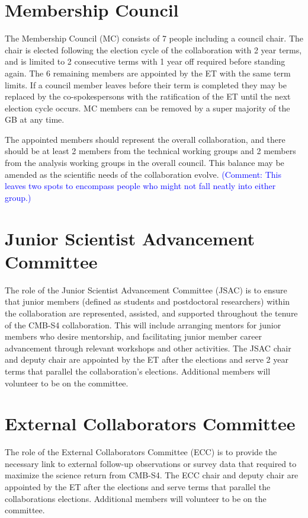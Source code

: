 \documentclass[12pt]{article}
\newcommand{\Comment}[1]{\textcolor{Blue}{(Comment: #1)}}
\newcommand{\exec}{{Executive Team}}
\newcommand{\shorte}{{ET }}  %
\begin{document}
\section{Membership Council}

The Membership Council (MC) consists of 7 people including a council chair. The chair is elected following the election cycle of the collaboration with  2 year terms, and is limited to 2 consecutive terms with 1 year off required before standing again. The 6 remaining members are appointed by the \shorte with the same term limits. If a council member leaves before their term is completed they may be replaced by the co-spokespersons with the ratification of the \shorte until the next election cycle occurs. MC members can be removed by a super majority of the GB at any time.  


The appointed members should represent the overall collaboration, and there should be at least 2 members from the technical working groups and 2 members from the analysis working groups in the overall council. This balance may be amended as the scientific needs of the collaboration evolve. \Comment{This leaves two spots to encompass people who might not fall neatly into either group.}





\section{Junior Scientist Advancement Committee}

The role of the Junior Scientist Advancement Committee (JSAC) is to ensure that junior members (defined as students and postdoctoral researchers) within the collaboration are represented, assisted, and supported throughout the  tenure of the CMB-S4 collaboration. This will include arranging mentors for junior members who desire mentorship, and facilitating junior member career advancement through relevant workshops and other activities. The JSAC chair and deputy chair are appointed by the \shorte after the elections and serve 2 year terms that parallel the collaboration's elections. Additional members will volunteer to be on the committee.


\section{External Collaborators Committee}

The role of the External Collaborators Committee (ECC) is to provide the necessary link to external follow-up observations or survey data that required to maximize the science return from CMB-S4. The ECC chair and deputy chair are appointed by the \shorte after the elections and serve terms that parallel the collaborations elections. Additional members will volunteer to be on the committee.
\end{document}
